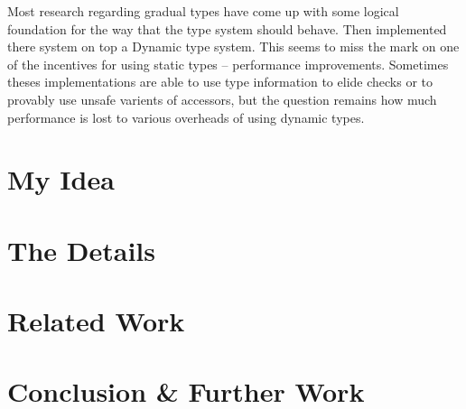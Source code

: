 \documentclass{article}
\begin{document}
Most research regarding gradual types have come up with some logical
foundation for the way that the type system should behave. Then implemented
there system on top a Dynamic type system. This seems to miss the mark on
one of the incentives for using static types -- performance improvements.
Sometimes theses implementations are able to use type information to elide checks
or to provably use unsafe varients of accessors, but the question remains how
much performance is lost to various overheads of using dynamic types.


\section{My Idea} %

\section{The Details} %


\section{Related Work}  %

\section{Conclusion & Further Work} %
\end{document}
